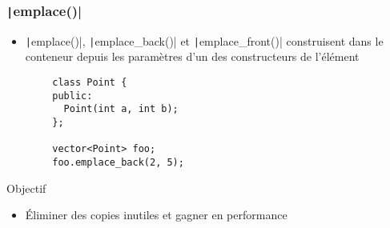 \documentclass[C++.tex]{subfiles}
\begin{document}
\begin{frame}[fragile]
	\frametitle{\texttt|emplace()|}
	\begin{itemize}
		\item \texttt|emplace()|, \texttt|emplace_back()| et \texttt|emplace_front()| construisent dans le conteneur depuis les paramètres d'un des constructeurs de l'élément
	\end{itemize}

	\begin{verbatim}
		class Point {
		public:
		  Point(int a, int b);
		};

		vector<Point> foo;
		foo.emplace_back(2, 5);
	\end{verbatim}

	\begin{block}{Objectif}
		\begin{itemize}
			\item Éliminer des copies inutiles et gagner en performance
		\end{itemize}

	\end{block}

\end{frame}
\end{document}
